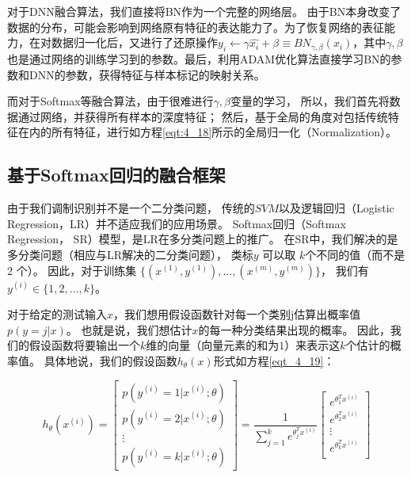 对于DNN融合算法，我们直接将BN作为一个完整的网络层。
由于BN本身改变了数据的分布，可能会影响到网络原有特征的表达能力了。为了恢复网络的表征能力，在对数据归一化后，又进行了还原操作$y_i \leftarrow \gamma \hat{x_i} + \beta \equiv BN_{\gamma, \beta}(x_i)$，其中$\gamma, \beta$也是通过网络的训练学习到的参数。最后，利用ADAM优化算法直接学习BN的参数和DNN的参数，获得特征与样本标记的映射关系。\par

而对于Softmax等融合算法，由于很难进行$\gamma, \beta$变量的学习，
所以，我们首先将数据通过网络，并获得所有样本的深度特征；
然后，基于全局的角度对包括传统特征在内的所有特征，进行如方程\eqref{eqt:4_18}所示的全局归一化（Normalization）。\par

\subsection{基于Softmax回归的融合框架}

由于我们调制识别并不是一个二分类问题，
传统的$SVM$以及逻辑回归（Logistic Regression，LR）并不适应我们的应用场景。
Softmax回归（Softmax Regression， SR）模型，是LR在多分类问题上的推广。
在SR中，我们解决的是多分类问题（相应与LR解决的二分类问题），
类标$y$ 可以取 $k$个不同的值（而不是 2 个）。
因此，对于训练集 $\{ (x^{(1)}, y^{(1)}), \dots, (x^{(m)}, y^{(m)}) \}$，
我们有$y^{(i)} \in \{1, 2, \dots, k\}$。\par

对于给定的测试输入$x$，我们想用假设函数针对每一个类别j估算出概率值$p(y=j | x)$。
也就是说，我们想估计$x$的每一种分类结果出现的概率。
因此，我们的假设函数将要输出一个$k$维的向量（向量元素的和为$1$）来表示这$k$个估计的概率值。
具体地说，我们的假设函数$h_{\theta}(x)$形式如方程\eqref{eqt_4_19}：

\begin{equation}
\label{eqt_4_19}
		h_\theta(x^{(i)}) =
		\begin{bmatrix}
			p(y^{(i)} = 1 | x^{(i)}; \theta) \\
			p(y^{(i)} = 2 | x^{(i)}; \theta) \\
			\vdots \\
			p(y^{(i)} = k | x^{(i)}; \theta)
		\end{bmatrix}
			=
			\frac{1}{ \sum_{j=1}^{k}{e^{ \theta_j^T x^{(i)} }} }
			\begin{bmatrix}
			e^{ \theta_1^T x^{(i)} } \\
			e^{ \theta_2^T x^{(i)} } \\
			\vdots \\
			e^{ \theta_k^T x^{(i)} } \\
			\end{bmatrix}
\end{equation}

